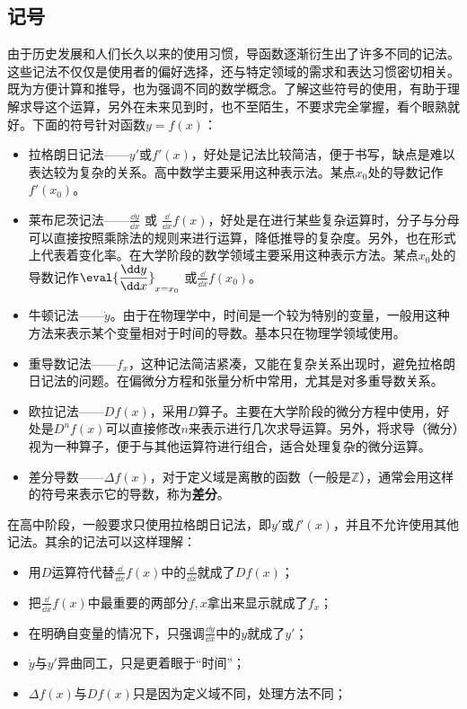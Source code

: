 \subsection{记号}
由于历史发展和人们长久以来的使用习惯，导函数逐渐衍生出了许多不同的记法。这些记法不仅仅是使用者的偏好选择，还与特定领域的需求和表达习惯密切相关。既为方便计算和推导，也为强调不同的数学概念。了解这些符号的使用，有助于理解求导这个运算，另外在未来见到时，也不至陌生，不要求完全掌握，看个眼熟就好。下面的符号针对函数$y=f(x)$：
\begin{itemize}
\item 拉格朗日记法——$y'$或$f'(x)$，好处是记法比较简洁，便于书写，缺点是难以表达较为复杂的关系。高中数学主要采用这种表示法。某点$x_0$处的导数记作$f'(x_0)$。
\item 莱布尼茨记法——$\displaystyle\frac{\dd y}{\dd x}$  或  $\displaystyle\frac{\dd}{\dd x}f(x)$，好处是在进行某些复杂运算时，分子与分母可以直接按照乘除法的规则来进行运算，降低推导的复杂度。另外，也在形式上代表着变化率。在大学阶段的数学领域主要采用这种表示方法。某点$x_0$处的导数记作$\displaystyle\eval{\dfrac{\dd y}{\dd x}}_{x=x_0}$ 或$\displaystyle\frac{\dd}{\dd x}f(x_0)$。
\item 牛顿记法——$\dot{y}$。由于在物理学中，时间是一个较为特别的变量，一般用这种方法来表示某个变量相对于时间的导数。基本只在物理学领域使用。
\item 重导数记法——$f_x$，这种记法简洁紧凑，又能在复杂关系出现时，避免拉格朗日记法的问题。在偏微分方程和张量分析中常用，尤其是对多重导数关系。
\item 欧拉记法——$Df(x)$，采用$D$算子。主要在大学阶段的微分方程中使用，好处是$D^n f(x)$可以直接修改$n$来表示进行几次求导运算。另外，将求导（微分）视为一种算子，便于与其他运算符进行组合，适合处理复杂的微分运算。
\item 差分导数——$\Delta f(x)$，对于定义域是离散的函数（一般是$\mathbb{Z}$），通常会用这样的符号来表示它的导数，称为\textbf{差分}。
\end{itemize}

在高中阶段，一般要求只使用拉格朗日记法，即$y'$或$f'(x)$，并且不允许使用其他记法。其余的记法可以这样理解：
\begin{itemize}
\item 用$D$运算符代替$\displaystyle\frac{\dd}{\dd x}f(x)$中的$\displaystyle\frac{\dd}{\dd x}$就成了$Df(x)$；
\item 把$\displaystyle\frac{\dd}{\dd x}f(x)$中最重要的两部分$f,x$拿出来显示就成了$f_x$；
\item 在明确自变量的情况下，只强调$\displaystyle\frac{\dd y}{\dd x}$中的$y$就成了$y'$；
\item $\dot{y}$与$y'$异曲同工，只是更着眼于“时间”；
\item $\Delta f(x)$与$Df(x)$只是因为定义域不同，处理方法不同；
\end{itemize}

